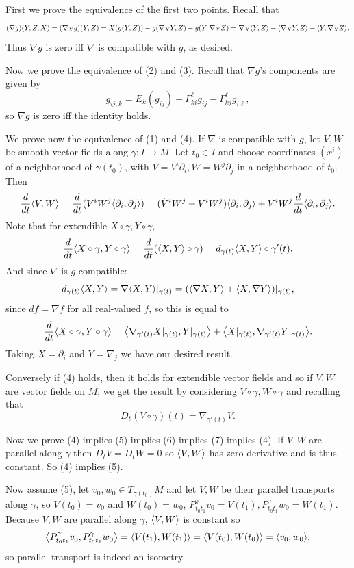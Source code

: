 \eprop

\bproof

    First we prove the equivalence of the first two points.
    Recall that
    $$ (\nabla g)(Y,Z,X) = (\nabla_Xg)(Y,Z) = X(g(Y,Z)) - g(\nabla_XY,Z) - g(Y,\nabla_XZ) =
    \nabla_X\mathopen{}\mathclose{\left<Y,Z\right>} - \mathopen{}\mathclose{\left<\nabla_XY,Z\right>} - \mathopen{}\mathclose{\left<Y,\nabla_XZ\right>} . $$
    Thus $\nabla g$ is zero iff $\nabla$ is compatible with $g$, as desired.

    Now we prove the equivalence of (2) and (3).
    Recall that $\nabla g$'s components are given by
    $$ g_{ij;k} = E_k(g_{ij}) - \Gamma^\ell_{ki}g_{ij} - \Gamma^\ell_{kj}g_{i\ell} , $$
    so $\nabla g$ is zero iff the identity holds.

    We prove now the equivalence of (1) and (4).
    If $\nabla$ is compatible with $g$, let $V,W$ be smooth vector fields along $\gamma\colon I\to M$.
    Let $t_0\in I$ and choose coordinates $(x^i)$ of a neighborhood of $\gamma(t_0)$, with $V=V^i\partial_i,W=W^j\partial_j$
    in a neighborhood of $t_0$.
    Then
    $$ {{d}\over{dt}}\mathopen{}\mathclose{\left<V,W\right>} = {{d}\over{dt}}(V^iW^j\mathopen{}\mathclose{\left<\partial_i,\partial_j\right>}) = (\dot V^iW^j + V^i\dot W^j)\mathopen{}\mathclose{\left<\partial_i,\partial_j\right>}
    + V^iW^j{{d}\over{dt}}\mathopen{}\mathclose{\left<\partial_i,\partial_j\right>} . $$
    Note that for extendible $X\circ\gamma,Y\circ\gamma$,
    $$ {{d}\over{dt}}\mathopen{}\mathclose{\left<X\circ\gamma,Y\circ\gamma\right>} = {{d}\over{dt}}\mathopen{}\mathclose{\left(\mathopen{}\mathclose{\left<X,Y\right>}\circ\gamma\right)} = d_{\gamma(t)}\mathopen{}\mathclose{\left<X,Y\right>}\circ\gamma'(t) . $$
    And since $\nabla$ is $g$-compatible:
    $$ d_{\gamma(t)}\mathopen{}\mathclose{\left<X,Y\right>} = \nabla\mathopen{}\mathclose{\left<X,Y\right>}|_{\gamma(t)} = (\mathopen{}\mathclose{\left<\nabla X,Y\right>} + \mathopen{}\mathclose{\left<X,\nabla Y\right>})|_{\gamma(t)} , $$
    since $df=\nabla f$ for all real-valued $f$, so this is equal to
    $$ {{d}\over{dt}}\mathopen{}\mathclose{\left<X\circ\gamma,Y\circ\gamma\right>} = \mathopen{}\mathclose{\left<\nabla_{\gamma'(t)}X|_{\gamma(t)},Y|_{\gamma(t)}\right>} +
    \mathopen{}\mathclose{\left<X|_{\gamma(t)},\nabla_{\gamma'(t)}Y|_{\gamma(t)}\right>} . $$
    Taking $X=\partial_i$ and $Y=\nabla_j$ we have our desired result.

    Conversely if (4) holds, then it holds for extendible vector fields and so if $V,W$ are vector fields on $M$, we get the result
    by considering $V\circ\gamma,W\circ\gamma$ and recalling that
    $$ D_t(V\circ\gamma)(t) = \nabla_{\gamma'(t)}V . $$

    Now we prove (4) implies (5) implies (6) implies (7) implies (4).
    If $V,W$ are parallel along $\gamma$ then $D_tV=D_tW=0$ so $\mathopen{}\mathclose{\left<V,W\right>}$ has zero derivative and is thus constant.
    So (4) implies (5).

    Now assume (5), let $v_0,w_0\in T_{\gamma(t_0)}M$ and let $V,W$ be their parallel transports along $\gamma$, so $V(t_0)=v_0$
    and $W(t_0)=w_0$, $P^\gamma_{t_0t_1}v_0=V(t_1),P^\gamma_{t_0t_1}w_0=W(t_1)$.
    Because $V,W$ are parallel along $\gamma$, $\mathopen{}\mathclose{\left<V,W\right>}$ is constant so
    $$ \mathopen{}\mathclose{\left<P^\gamma_{t_0t_1}v_0,P^\gamma_{t_0t_1}w_0\right>} = \mathopen{}\mathclose{\left<V(t_1),W(t_1)\right>} = \mathopen{}\mathclose{\left<V(t_0),W(t_0)\right>} = \mathopen{}\mathclose{\left<v_0,w_0\right>}, $$
    so parallel transport is indeed an isometry.

